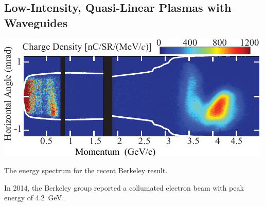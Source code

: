 \documentclass[12pt,letter]{article}
\begin{document}
\subsection{Low-Intensity, Quasi-Linear Plasmas with Waveguides}

\begin{marginfigure}
    \includegraphics[width=\marginparwidth]{../figures/esaenergy.pdf}
    \caption{The energy spectrum for the recent Berkeley result.}
\end{marginfigure}


In 2014, the Berkeley group reported a collumated electron beam with peak
energy of \SI{4.2}{\giga \electronvolt}.
\end{document}
